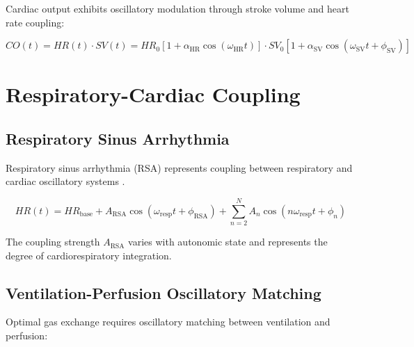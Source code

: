 \documentclass[twocolumn]{article}
\begin{document}
Cardiac output exhibits oscillatory modulation through stroke volume and heart rate coupling:

\begin{equation}
CO(t) = HR(t) \cdot SV(t) = HR_0[1 + \alpha_{\text{HR}} \cos(\omega_{\text{HR}}t)] \cdot SV_0[1 + \alpha_{\text{SV}} \cos(\omega_{\text{SV}}t + \phi_{\text{SV}})]
\label{eq:cardiac_output}
\end{equation}

\section{Respiratory-Cardiac Coupling}

\subsection{Respiratory Sinus Arrhythmia}

Respiratory sinus arrhythmia (RSA) represents coupling between respiratory and cardiac oscillatory systems \citep{berntson1993respiratory}.

\begin{equation}
HR(t) = HR_{\text{base}} + A_{\text{RSA}} \cos(\omega_{\text{resp}}t + \phi_{\text{RSA}}) + \sum_{n=2}^N A_n \cos(n\omega_{\text{resp}}t + \phi_n)
\label{eq:rsa}
\end{equation}

The coupling strength $A_{\text{RSA}}$ varies with autonomic state and represents the degree of cardiorespiratory integration.

\subsection{Ventilation-Perfusion Oscillatory Matching}

Optimal gas exchange requires oscillatory matching between ventilation and perfusion:
\end{document}
